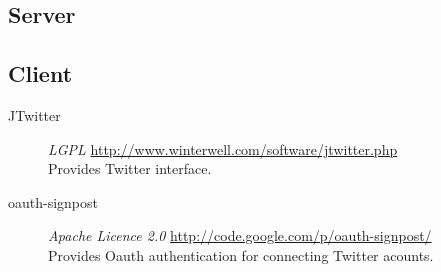 \subsection{Server}


\subsection{Client}

\begin{description}
    \item[JTwitter] \emph{LGPL} \url{http://www.winterwell.com/software/jtwitter.php} \hfill \\
        Provides Twitter interface.
    \item[oauth-signpost] \emph{Apache Licence 2.0} \url{http://code.google.com/p/oauth-signpost/} \hfill \\
        Provides Oauth authentication for connecting Twitter acounts.
\end{description}
